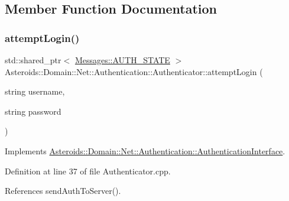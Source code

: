 \subsection{Member Function Documentation}
\mbox{\label{classAsteroids_1_1Domain_1_1Net_1_1Authentication_1_1Authenticator_a1dd2c0964bae0658b8477c7d041f62d5}} 
\subsubsection{\texorpdfstring{attempt\+Login()}{attemptLogin()}}
{\footnotesize\ttfamily std\+::shared\+\_\+ptr$<$ \hyperlink{classAsteroids_1_1Domain_1_1Net_1_1Messages_1_1AUTH__STATE}{Messages\+::\+A\+U\+T\+H\+\_\+\+S\+T\+A\+TE} $>$ Asteroids\+::\+Domain\+::\+Net\+::\+Authentication\+::\+Authenticator\+::attempt\+Login (\begin{DoxyParamCaption}\item[{string}]{username,  }\item[{string}]{password }\end{DoxyParamCaption})\hspace{0.3cm}{\ttfamily [virtual]}}



Implements \hyperlink{classAsteroids_1_1Domain_1_1Net_1_1Authentication_1_1AuthenticationInterface_a2358abf451a5aa6df9d29e9dfda2898c}{Asteroids\+::\+Domain\+::\+Net\+::\+Authentication\+::\+Authentication\+Interface}.



Definition at line 37 of file Authenticator.\+cpp.



References send\+Auth\+To\+Server().

